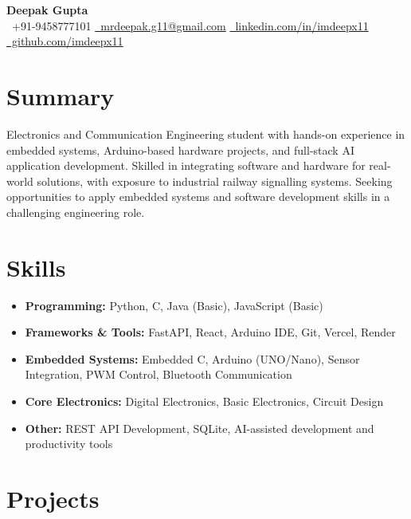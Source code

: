 \documentclass[a4paper,10pt]{article}
\begin{document}
\begin{center}

{\Huge\textbf{Deepak Gupta}}\\[5pt]

\small
\faPhone\ +91-9458777101
\quad
\href{mailto:mrdeepak.g11@gmail.com}{\faEnvelope\ mrdeepak.g11@gmail.com}
\quad
\href{https://linkedin.com/in/imdeepx11}{\faLinkedin\ linkedin.com/in/imdeepx11}
\quad
\href{https://github.com/imdeepx11}{\faGithub\ github.com/imdeepx11}

\end{center}

\section{Summary}

Electronics and Communication Engineering student with hands-on experience in embedded systems, Arduino-based hardware projects, and full-stack AI application development. Skilled in integrating software and hardware for real-world solutions, with exposure to industrial railway signalling systems. Seeking opportunities to apply embedded systems and software development skills in a challenging engineering role.

\section{Skills}

\begin{itemize}
    \item \textbf{Programming:} Python, C, Java (Basic), JavaScript (Basic)
    \item \textbf{Frameworks \& Tools:} FastAPI, React, Arduino IDE, Git, Vercel, Render
    \item \textbf{Embedded Systems:} Embedded C, Arduino (UNO/Nano), Sensor Integration, PWM Control, Bluetooth Communication
    \item \textbf{Core Electronics:} Digital Electronics, Basic Electronics, Circuit Design
    \item \textbf{Other:} REST API Development, SQLite, AI-assisted development and productivity tools
\end{itemize}

\section{Projects}
\end{document}
